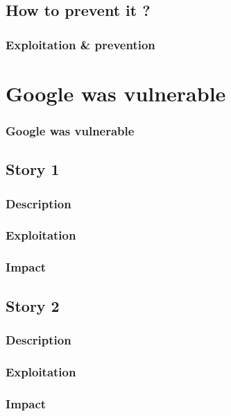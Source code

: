 \documentclass[svgnames]{beamer}
\begin{document}
\subsection{How to prevent it ?}
\begin{frame}
  \frametitle{Exploitation \& prevention} %
\end{frame}




\section{Google was vulnerable}
\begin{frame}
  \frametitle{Google was vulnerable}
  \tableofcontents[currentsection]
\end{frame}

\subsection{Story 1}

\begin{frame}
  \frametitle{Description}
\end{frame}

\begin{frame}
  \frametitle{Exploitation}
\end{frame}

\begin{frame}
  \frametitle{Impact}
\end{frame}


\subsection{Story 2}

\begin{frame}
  \frametitle{Description}
\end{frame}

\begin{frame}
  \frametitle{Exploitation}
\end{frame}

\begin{frame}
  \frametitle{Impact}
\end{frame}
\end{document}
